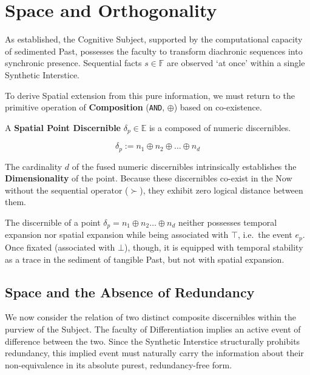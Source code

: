 
\section{Space and Orthogonality}

As established, the Cognitive Subject, supported by the computational capacity
of sedimented Past, possesses the faculty to transform diachronic sequences
into synchronic presence. Sequential facts $s \in \mathbb{F}$ are
observed `at once' within a single Synthetic Interstice.

To derive Spatial extension from this pure information, we must return to the
primitive operation of \textbf{Composition} (\texttt{AND}, $\oplus$) based on
co-existence.

\begin{formalism}

    A \textbf{Spatial Point Discernible} $\delta_p \in \mathbb{E}$ is a
    composed of numeric discernibles. 
    
    \begin{equation}
        \delta_p := n_1 \oplus n_2 \oplus \dots \oplus n_d 
    \end{equation}
    
    The cardinality $d$ of the fused numeric discernibles intrinsically
    establishes the \textbf{Dimensionality} of the point. Because these
    discernibles co-exist in the Now without the sequential operator ($\succ$),
    they exhibit zero logical distance between them.

\end{formalism}

The discernible of a point $\delta_p = n_1 \oplus n_2 \dots \oplus n_d$
neither possesses temporal expansion nor spatial expansion while being
associated with $\top$, i.e.\ the event $e_p$. Once fixated (associated with
$\bot$), though, it is equipped with temporal stability as a trace in the
sediment of tangible Past, but not with spatial expansion.

\subsection{Space and the Absence of Redundancy}

We now consider the relation of two distinct composite discernibles within the
purview of the Subject. The faculty of Differentiation implies an active event
of difference between the two. Since the Synthetic Interstice structurally
prohibits redundancy, this implied event must naturally carry the information
about their non-equivalence in its absolute purest, redundancy-free form. 

